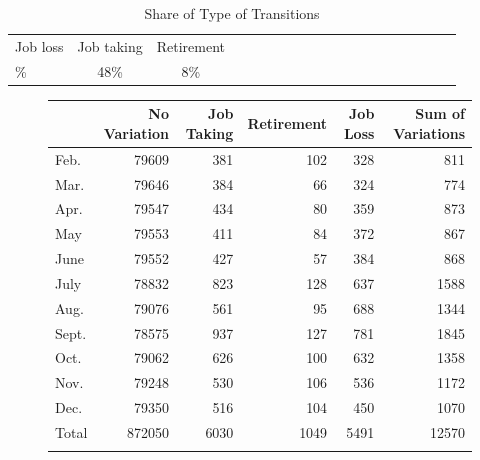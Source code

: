 \begin{table}
\caption{Share of Type of Transitions}%
\label{table}
\centering
\begin{tabular}
[c]{lcccccccccccccccccc}%
\toprule \addlinespace[5pt] Job loss & Job taking & Retirement 
 \\
\cmidrule(r){1-3} \addlinespace[5pt] 44\% & 48\% & 8\%  \\
\bottomrule
\end{tabular}
\end{table}

\begin{figure}
\par
\begin{center}%
\begin{tabular}
[c]{lrrrrr}%
\toprule {} & No Variation & Job Taking & Retirement & Job Loss & Sum of
Variations\\
\midrule Feb. & 79609 & 381 & 102 & 328 & 811\\
Mar. & 79646 & 384 & 66 & 324 & 774\\
Apr. & 79547 & 434 & 80 & 359 & 873\\
May & 79553 & 411 & 84 & 372 & 867\\
June & 79552 & 427 & 57 & 384 & 868\\
July & 78832 & 823 & 128 & 637 & 1588\\
Aug. & 79076 & 561 & 95 & 688 & 1344\\
Sept. & 78575 & 937 & 127 & 781 & 1845\\
Oct. & 79062 & 626 & 100 & 632 & 1358\\
Nov. & 79248 & 530 & 106 & 536 & 1172\\
Dec. & 79350 & 516 & 104 & 450 & 1070\\
Total & 872050 & 6030 & 1049 & 5491 & 12570\\
\bottomrule &  &  &  &  &
\end{tabular}
\end{center}
\end{figure}

%


